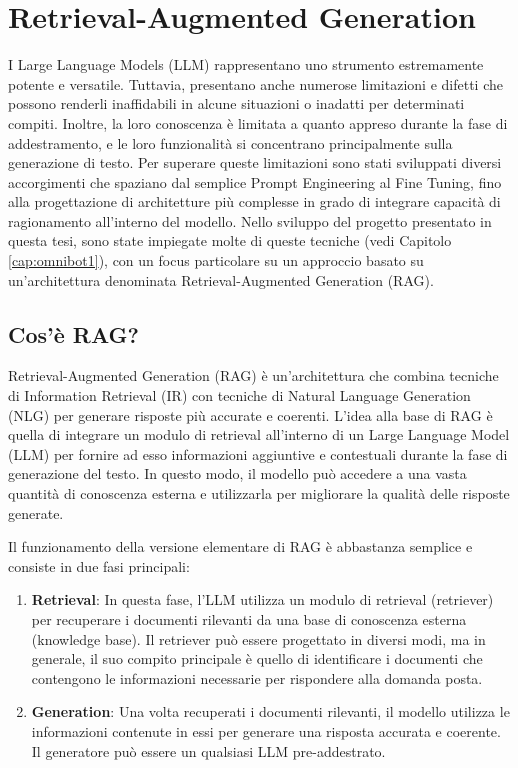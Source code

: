 \chapter{Retrieval-Augmented Generation}
I Large Language Models (LLM) rappresentano uno strumento estremamente potente e versatile. Tuttavia, presentano anche numerose limitazioni e difetti che possono renderli inaffidabili in alcune situazioni o inadatti per determinati compiti. Inoltre, la loro conoscenza è limitata a quanto appreso durante la fase di addestramento, e le loro funzionalità si concentrano principalmente sulla generazione di testo. Per superare queste limitazioni sono stati sviluppati diversi accorgimenti che spaziano dal semplice Prompt Engineering al Fine Tuning, fino alla progettazione di architetture più complesse in grado di integrare capacità di ragionamento all'interno del modello.
Nello sviluppo del progetto presentato in questa tesi, sono state impiegate molte di queste tecniche (vedi Capitolo \ref{cap:omnibot1}), con un focus particolare su un approccio basato su un'architettura denominata Retrieval-Augmented Generation (RAG).

\section{Cos'è RAG?}
Retrieval-Augmented Generation (RAG) \cite{whatisrag,raghandbook,gao2024retrievalaugmentedgenerationlargelanguage} è un'architettura che combina tecniche di Information Retrieval (IR) con tecniche di Natural Language Generation (NLG) per generare risposte più accurate e coerenti. L'idea alla base di RAG è quella di integrare un modulo di retrieval all'interno di un Large Language Model (LLM) per fornire ad esso informazioni aggiuntive e contestuali durante la fase di generazione del testo. In questo modo, il modello può accedere a una vasta quantità di conoscenza esterna e utilizzarla per migliorare la qualità delle risposte generate.

Il funzionamento della versione elementare di RAG è abbastanza semplice e consiste in due fasi principali:
\begin{enumerate}
    \item \textbf{Retrieval}: In questa fase, l'LLM utilizza un modulo di retrieval (retriever) per recuperare i documenti rilevanti da una base di conoscenza esterna (knowledge base). Il retriever può essere progettato in diversi modi, ma in generale, il suo compito principale è quello di identificare i documenti che contengono le informazioni necessarie per rispondere alla domanda posta.
    \item \textbf{Generation}: Una volta recuperati i documenti rilevanti, il modello utilizza le informazioni contenute in essi per generare una risposta accurata e coerente. Il generatore può essere un qualsiasi LLM pre-addestrato.
\end{enumerate}

